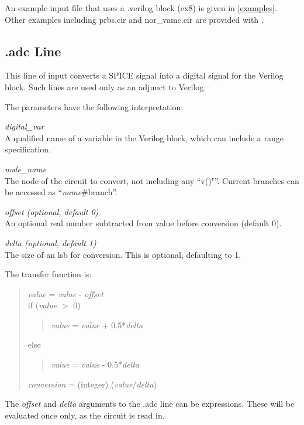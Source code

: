 An example input file that uses a {\vt .verilog} block ({\vt ex8}) is
given in \ref{examples}.  Other examples including {\vt prbs.cir} and
{\vt nor\_vamc.cir} are provided with {\WRspice}.


\subsection{{\vt .adc} Line}
This line of {\WRspice} input converts a SPICE signal into a digital
signal for the Verilog block.  Such lines are used only as an adjunct
to Verilog.


The parameters have the following interpretation:

\begin{description}
\item{\it digital\_var}\\
A qualified name of a variable in the Verilog block, which
can include a range specification.
\item{\it node\_name}\\
The node of the circuit to convert, not including any ``{\vt v()"}''.
Current branches can be accessed as ``{\it name\/}{\vt \#branch}''.
\item{\it offset {\rm (optional, default 0)}}\\
An optional real number subtracted from value before conversion (default 0).
\item{\it delta {\rm (optional, default 1)}}\\
The size of an lsb for conversion.  This is optional, defaulting to 1.
\end{description}

The transfer function is:
\begin{quote}\vt
    {\it value} = {\it value} - {\it offset}\\
    if ({\it value} $>$ 0)
    \begin{quote}
        {\it value} = {\it value} + 0.5*{\it delta}\\
    \end{quote}
    else
    \begin{quote}
        {\it value} = {\it value} - 0.5*{\it delta}\\
    \end{quote}
    {\it conversion} = (integer) ({\it value\/}/{\it delta\/})
\end{quote}

The {\it offset} and {\it delta} arguments to the {\vt .adc} line can
be expressions.  These will be evaluated once only, as the circuit is
read in.



